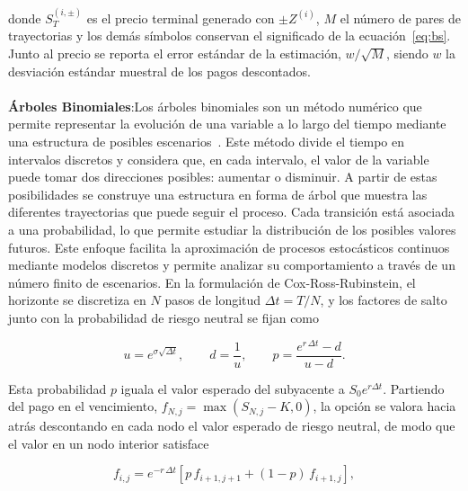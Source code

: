 \documentclass{article}
\begin{document}
donde $S_T^{(i,\pm)}$ es el precio terminal generado con $\pm Z^{(i)}$, $M$ el número de pares de trayectorias y los demás símbolos conservan el significado de la ecuación~\eqref{eq:bs}. Junto al precio se reporta el error estándar de la estimación, $w/\sqrt{M}$, siendo $w$ la desviación estándar muestral de los pagos descontados.
\\
\\
\textbf{Árboles Binomiales}:Los árboles binomiales son un método numérico que permite representar la evolución de una variable a lo largo del tiempo mediante una estructura de posibles escenarios~\cite{coxrossrubinstein1979}. Este método divide el tiempo en intervalos discretos y considera que, en cada intervalo, el valor de la variable puede tomar dos direcciones posibles: aumentar o disminuir. A partir de estas posibilidades se construye una estructura en forma de árbol que muestra las diferentes trayectorias que puede seguir el proceso. Cada transición está asociada a una probabilidad, lo que permite estudiar la distribución de los posibles valores futuros. Este enfoque facilita la aproximación de procesos estocásticos continuos mediante modelos discretos y permite analizar su comportamiento a través de un número finito de escenarios. En la formulación de Cox-Ross-Rubinstein, el horizonte se discretiza en $N$ pasos de longitud $\Delta t=T/N$, y los factores de salto junto con la probabilidad de riesgo neutral se fijan como~\cite{coxrossrubinstein1979, marin2025metodos}

\begin{equation}
u=e^{\sigma\sqrt{\Delta t}},\qquad
d=\frac{1}{u},\qquad
p=\frac{e^{r\,\Delta t}-d}{u-d}.
\label{eq:crr_param}
\end{equation}

Esta probabilidad $p$ iguala el valor esperado del subyacente a $S_0e^{r\Delta t}$. Partiendo del pago en el vencimiento, $f_{N,j}=\max(S_{N,j}-K,0)$, la opción se valora hacia atrás descontando en cada nodo el valor esperado de riesgo neutral, de modo que el valor en un nodo interior satisface

\begin{equation}
f_{i,j}=e^{-r\,\Delta t}\left[p\,f_{i+1,j+1}+(1-p)\,f_{i+1,j}\right],
\label{eq:crr_induccion}
\end{equation}
\end{document}
